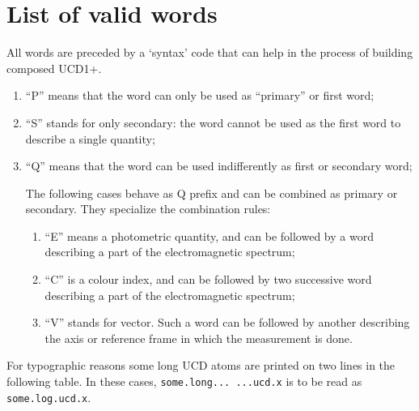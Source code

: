 \documentclass[11pt,a4paper]{ivoa}
\begin{document}
\section{List of valid words}
\label{sec:list}

All words are preceded by a `syntax' code that can help in the process of building composed UCD1+.
\begin{enumerate}
\item ``P'' means that the word can only be used as ``primary'' or first word;
\item ``S'' stands for only secondary: the word cannot be used as the first word to describe a 
single quantity;
\item ``Q'' means that the word can be used indifferently as first or secondary word;

The following cases behave as Q prefix and can be combined  as primary or secondary.
They specialize the combination rules:  
	\begin{enumerate}[label*=\arabic*.]
	\item ``E'' means a photometric quantity, and can be followed by a word describing a part of 
	the electromagnetic spectrum;
	\item ``C'' is a colour index, and can be followed by two successive word describing a part of 
	the electromagnetic spectrum;
	\item ``V'' stands for vector. Such a word can be followed by another describing the axis or 
	reference frame in which the measurement is done.
	\end{enumerate}
\end{enumerate}

For typographic reasons some long UCD atoms are printed on two
lines in the following table.  In these cases, \texttt{some.long...
...ucd.x} is to be read as \texttt{some.log.ucd.x}.

\newpage
\end{document}
